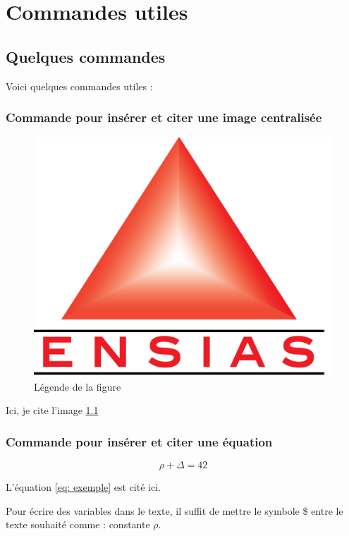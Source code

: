 \chapter{Commandes utiles}
\section{Quelques commandes}

Voici quelques commandes utiles : \cite{latex:companion}

\subsection{Commande pour insérer et citer une image centralisée}

\begin{figure}[h!]
    \centering
    \includegraphics[width=0.5\linewidth]{logos/ensias.png}
    \caption{Légende de la figure}
    \label{fig:Label de la figure}
\end{figure}
Ici, je cite l'image \ref{fig:Label de la figure}


\subsection{Commande pour insérer et citer une équation}
\begin{equation} \label{eq: exemple}
\rho + \Delta = 42
\end{equation}

L'équation \ref{eq: exemple} est cité ici. \cite{knuth:1984}


Pour écrire des variables dans le texte, il suffit de mettre le symbole \$ entre le texte souhaité comme : constante $\rho$. 


